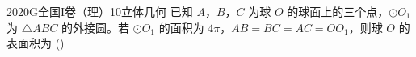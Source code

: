 
\begin{problem}{2020}{G}{全国I卷（理）}{10}{立体几何}
已知 $ A $，$ B $，$ C $ 为球 $ O $ 的球面上的三个点，$ \odot O_1 $ 为 $ \triangle ABC $ 的外接圆。若 $ \odot O_1 $ 的面积为 $ 4\pi $，$ AB = BC = AC = OO_1 $，则球 $ O $ 的表面积为 (\hspace{1cm})
\begin{choices}
\choice{{$64\pi$}}
\choice{{$48\pi$}}
\choice{{$36\pi$}}
\choice{{$32\pi$}}
\end{choices}
\end{problem}

\begin{answer}

\end{answer}

\begin{solutions}

\end{solutions}